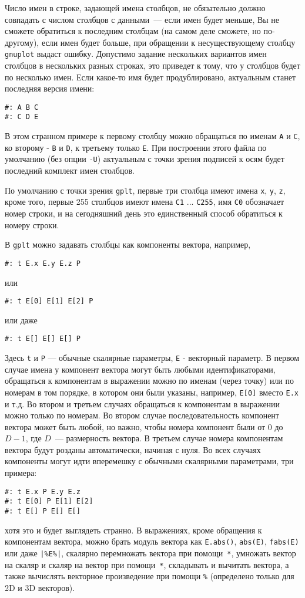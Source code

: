 \documentclass[12pt]{article}
\def\gplt{{\tt gplt}}
\def\gnuplot{{\tt gnuplot}}
\begin{document}
Число имен в строке, задающей имена столбцов, не обязательно должно совпадать с числом столбцов с данными~--- если имен будет меньше, Вы не сможете обратиться к
последним столбцам (на самом деле сможете, но по-другому), если имен будет больше, при обращении к несуществующему столбцу \gnuplot{} выдаст ошибку.
Допустимо задание нескольких вариантов имен столбцов в нескольких разных строках, это приведет к тому, что у столбцов будет по несколько имен.
Если какое-то имя будет продублировано, актуальным станет последняя версия имени:
\begin{verbatim}
#: A B C
#: C D E
\end{verbatim}
В этом странном примере к первому столбцу можно обращаться по именам \verb'A' и \verb'C', ко второму - \verb'B' и \verb'D', к третьему только \verb'E'.
При построении этого файла по умолчанию (без опции \verb'-U') актуальным с точки зрения подписей к осям будет последний комплект имен столбцов. 

По умолчанию с точки зрения \gplt, первые три столбца имеют имена \verb'x', \verb'y', \verb'z', кроме того, первые 255 столбцов имеют имена \verb'C1' ... \verb'C255',
имя \verb'C0' обозначает номер строки, и на сегодняшний день это единственный способ обратиться к номеру строки. 

В \gplt{} можно задавать столбцы как компоненты вектора, например,
\begin{verbatim}
#: t E.x E.y E.z P 
\end{verbatim}
или
\begin{verbatim}
#: t E[0] E[1] E[2] P 
\end{verbatim}
или даже
\begin{verbatim}
#: t E[] E[] E[] P 
\end{verbatim}
Здесь \verb't' и \verb'P' --- обычные скалярные параметры, \verb'E' - векторный параметр.
В первом случае имена у компонент вектора могут быть любыми идентификаторами, обращаться к компонентам в выражении можно
по именам (через точку) или по номерам в том порядке, в котором они были указаны, например, \verb'E[0]' вместо \verb'E.x' и т.д.
Во втором и третьем случаях обращаться к компонентам в выражении можно только по номерам.
Во втором случае последовательность компонент
 вектора может быть любой, но важно, чтобы номера компонент были от $0$ до $D-1$, где $D$~--- размерность вектора. В третьем случае
 номера компонентам вектора будут розданы автоматически, начиная с нуля.
Во всех случаях компоненты могут идти вперемешку с обычными скалярными параметрами, три примера:
\begin{verbatim}
#: t E.x P E.y E.z  
#: t E[0] P E[1] E[2]
#: t E[] P E[] E[]  
\end{verbatim}
хотя это и будет выглядеть странно.
В выражениях, кроме обращения к компонентам вектора, можно брать модуль вектора как \verb'E.abs()', \verb'abs(E)',  \verb'fabs(E)' или даже  \verb'|%E%|',
скалярно перемножать вектора при помощи~\verb'*',
умножать вектор на скаляр и скаляр на вектор при помощи~\verb'*', складывать и вычитать вектора, а также вычислять векторное произведение при помощи \verb'%'
(определено только для 2D и 3D векторов).
\end{document}
